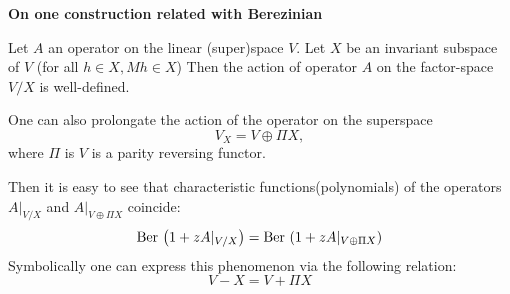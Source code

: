 \def\vare {\varepsilon}
\def\A {\bf A}
\def\t {\tilde}
\def\a {\alpha}
\def\K {{\bf K}}
\def\N {{\bf N}}
\def\V {{\cal V}}
\def\s {{\sigma}}
\def\S {{\Sigma}}
\def\s {{\sigma}}
\def\p{\partial}
\def\vare{{\varepsilon}}
\def\Q {{\bf Q}}
\def\D {{\cal D}}
\def\G {{\Gamma}}
\def\C {{\bf C}}
\def\M {{\cal M}}
\def\Z {{\bf Z}}
\def\U  {{\cal U}}
\def\H {{\cal H}}
\def\R  {{\bf R}}
\def\E  {{\bf E}}
\def\l {\lambda}
\def\degree {{\bf {\rm degree}\,\,}}
\def \finish {${\,\,\vrule height1mm depth2mm width 8pt}$}
\def \m {\medskip}
\def\p {\partial}
\def\r {{\bf r}}
\def\v {{\bf v}}
\def\n {{\bf n}}
\def\t {{\bf t}}
\def\b {{\bf b}}
\def\ac {{\bf a}}
\def \X   {{\bf X}}
\def \Y   {{\bf Y}}
\def\Tr {{\rm Tr\,}}
\def\Ber {{\rm Ber\,}}
   \centerline{\bf On one construction related with Berezinian}


Let $A$ an operator on the linear (super)space $V$. Let $X$ be an
invariant subspace of $V$ (for all $h\in X, Mh\in X$)
Then the action of operator $A$ on the factor-space  $V/X$ is well-defined.

One can also prolongate the action of the operator
 on the superspace
                  $$
                  V_X=V\oplus\Pi X,
                  $$
where $\Pi $ is $V$ is a parity  reversing functor.

Then it is easy to see that characteristic functions(polynomials) of the operators
$A\vert_{V/X}$ and $A\vert_{V\oplus\Pi X}$ coincide:
                     $$
     \Ber \left(1+zA\vert_{V/X}\right)=\Ber \left(1+zA\vert_{V\oplus\Pi X}\right)
                     $$
Symbolically one can express this phenomenon via the following relation:
                  $$
                  V-X=V+\Pi X
                  $$


\bye
